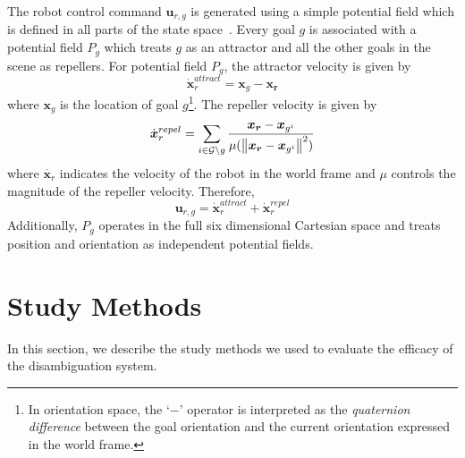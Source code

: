 The robot control command $\boldsymbol{u}_{r,g}$ is generated using a simple potential field which is defined in all parts of the state space~\cite{khatib1986real}. Every goal $g$ is associated with a potential field $P_g$ which treats $g$ as an attractor and all the other goals in the scene as repellers. For potential field $P_g$, the attractor velocity is given by
\begin{equation*}
\dot{\boldsymbol{x}}_r^{attract} = \boldsymbol{x}_{g} - \boldsymbol{x_r}
\end{equation*}
where $\boldsymbol{x}_{g}$ is the location of goal $g$\footnote{In orientation space, the `$-$' operator is interpreted as the \textit{quaternion difference} between the goal orientation and the current orientation expressed in the world frame.}. The repeller velocity is given by
\begin{equation*}
\dot{\boldsymbol{x}}_r^{repel} = \sum_{i \in \mathcal{G} \setminus g} \frac{\boldsymbol{x_r} - \boldsymbol{x}_{g^i}}{\mu(\left\lVert\boldsymbol{x_r} - \boldsymbol{x}_{g^i}\right\rVert^2)}
\end{equation*}
where $\dot{\boldsymbol{x}_r}$ indicates the velocity of the robot in the world frame and $\mu$ controls the magnitude of the repeller velocity. Therefore, 
\begin{equation*}
\boldsymbol{u}_{r,g} = \dot{\boldsymbol{x}}_r^{attract} + \dot{\boldsymbol{x}}_r^{repel} 
\end{equation*}
Additionally, $P_g$ operates in the full six dimensional Cartesian space and treats position and orientation as independent potential fields. 
%
%
%


\section{Study Methods}\label{sec:ed}
In this section, we describe the study methods we used to evaluate the efficacy of the disambiguation system. 
